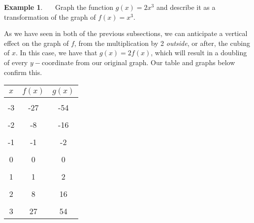 \documentclass[12pt]{book}
\theoremstyle{definition}
\newtheorem{example}{Example}
\begin{document}
\begin{example}~~~Graph the function $g(x)=2x^3$ and describe it as a transformation of the graph of $f(x)=x^3$.\par
As we have seen in both of the previous subsections, we can anticipate a vertical effect on the graph of $f$, from the multiplication by 2 {\it outside}, or after, the cubing of $x$.  In this case, we have that $g(x)=2f(x)$, which will result in a doubling of every $y-$coordinate from our original graph.  Our table and graphs below confirm this. 
\newpage
\begin{multicols}{2}
\begin{center}
\begin{tabular}{c||c|c}
$x$ & $f(x)$ &  $g(x)$ \\
\hline
&&\\
-3 & -27 &  -54 \\
&&\\
-2 & -8 &  -16 \\
&&\\
-1 & -1 &  -2 \\
&&\\
0 & 0 &  0 \\
&&\\
1 & 1 &  2 \\
&&\\
2 & 8 &  16 \\
&&\\
3 & 27 &  54 
\end{tabular}
\end{center}
\columnbreak
\begin{center}
\end{center}
\end{multicols}
\end{example}
\end{document}
